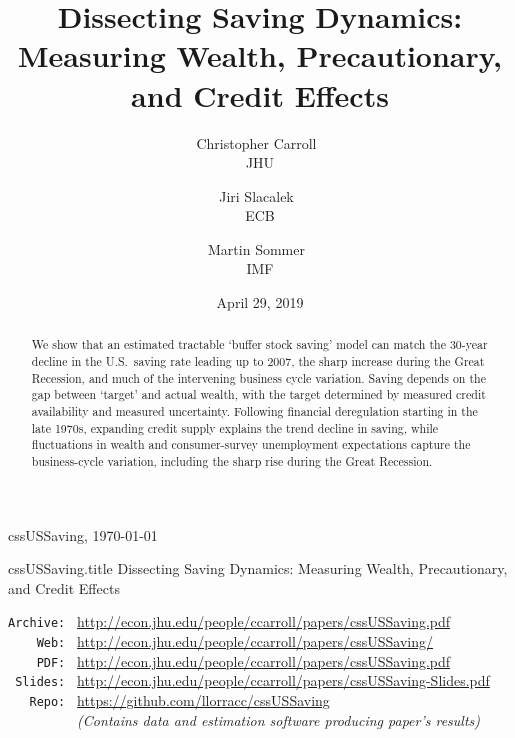 \documentclass[titlepage]{\econtex}
\providecommand{\texname}{cssUSSaving}
\begin{document}

\hfill{\tiny \texname, \today}

\begin{verbatimwrite}{\texname.title}
Dissecting Saving Dynamics: Measuring Wealth, Precautionary, and Credit Effects
\end{verbatimwrite}

\title{Dissecting Saving Dynamics:  Measuring Wealth, Precautionary, and Credit Effects  }

\medskip\medskip

\author{
{Christopher Carroll\tiny{~}}\authNum \\ {\small JHU}
\and
{Jiri Slacalek\tiny{~}}\authNum \\ {\small ECB}
\and
{Martin Sommer\tiny{~}}\authNum \\ {\small IMF}
}

\date{April 29, 2019}

\maketitle




\begin{abstract}
We show that an estimated tractable `buffer stock saving' model can match the 30-year decline in the U.S.\ saving rate leading up to 2007, the sharp increase during the Great Recession, and much of the intervening business cycle variation.  Saving depends on the gap between `target' and actual wealth, with the target determined by measured credit availability and measured uncertainty.  Following financial deregulation starting in the late 1970s, expanding credit supply explains the trend decline in saving, while fluctuations in wealth and consumer-survey unemployment expectations capture the business-cycle variation, including the sharp rise during the Great Recession.
\end{abstract}

\parbox{\textwidth}{
\begin{center}
\begin{tabbing}
\texttt{Archive:~} \= \= \url{http://econ.jhu.edu/people/ccarroll/papers/cssUSSaving.pdf} \kill \\  
\texttt{~~~~Web:~} \> \> \url{http://econ.jhu.edu/people/ccarroll/papers/cssUSSaving/} \\
\texttt{~~~~PDF:~} \> \> \url{http://econ.jhu.edu/people/ccarroll/papers/cssUSSaving.pdf} \\
\texttt{~Slides:~} \> \> \url{http://econ.jhu.edu/people/ccarroll/papers/cssUSSaving-Slides.pdf} \\
\texttt{~~~Repo:~} \> \> \url{https://github.com/llorracc/cssUSSaving} \\
\texttt{~~~~~~~~~} \> \> {\it (Contains data and estimation software producing paper's results)}
\end{tabbing}
\end{center}
}
\end{document}
